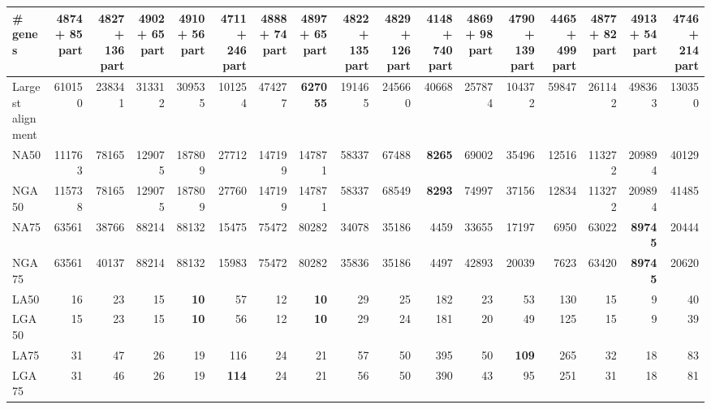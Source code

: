 \documentclass[12pt,a4paper]{article}
\begin{document}
\begin{table}[ht]
\begin{center}
\begin{tabular}{|l*{16}{|r}|}
\# genes & 4874 + 85 part & 4827 + 136 part & 4902 + 65 part & 4910 + 56 part & 4711 + 246 part & 4888 + 74 part & 4897 + 65 part & 4822 + 135 part & 4829 + 126 part & 4148 + 740 part & 4869 + 98 part & 4790 + 139 part & 4465 + 499 part & 4877 + 82 part & {\bf 4913 + 54 part} & 4746 + 214 part \\ \hline
Largest alignment & 610150 & 238341 & 313312 & 309535 & 101254 & 474277 & {\bf 627055} & 191465 & 245660 & 40668 & 257874 & 104372 & 59847 & 261142 & 498363 & 130350 \\ \hline
NA50 & 111763 & 78165 & 129075 & 187809 & 27712 & 147199 & 147871 & 58337 & 67488 & {\bf 8265} & 69002 & 35496 & 12516 & 113272 & 209894 & 40129 \\ \hline
NGA50 & 115738 & 78165 & 129075 & 187809 & 27760 & 147199 & 147871 & 58337 & 68549 & {\bf 8293} & 74997 & 37156 & 12834 & 113272 & 209894 & 41485 \\ \hline
NA75 & 63561 & 38766 & 88214 & 88132 & 15475 & 75472 & 80282 & 34078 & 35186 & 4459 & 33655 & 17197 & 6950 & 63022 & {\bf 89745} & 20444 \\ \hline
NGA75 & 63561 & 40137 & 88214 & 88132 & 15983 & 75472 & 80282 & 35836 & 35186 & 4497 & 42893 & 20039 & 7623 & 63420 & {\bf 89745} & 20620 \\ \hline
LA50 & 16 & 23 & 15 & {\bf 10} & 57 & 12 & {\bf 10} & 29 & 25 & 182 & 23 & 53 & 130 & 15 & 9 & 40 \\ \hline
LGA50 & 15 & 23 & 15 & {\bf 10} & 56 & 12 & {\bf 10} & 29 & 24 & 181 & 20 & 49 & 125 & 15 & 9 & 39 \\ \hline
LA75 & 31 & 47 & 26 & 19 & 116 & 24 & 21 & 57 & 50 & 395 & 50 & {\bf 109} & 265 & 32 & 18 & 83 \\ \hline
LGA75 & 31 & 46 & 26 & 19 & {\bf 114} & 24 & 21 & 56 & 50 & 390 & 43 & 95 & 251 & 31 & 18 & 81 \\ \hline
\end{tabular}
\end{center}
\end{table}
\end{document}
